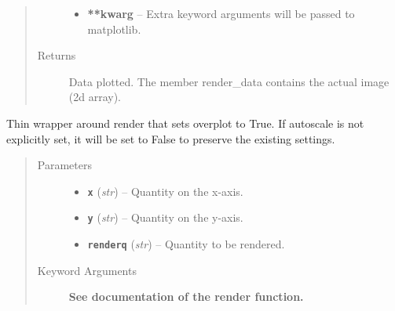 \documentclass[letterpaper,10pt,english]{sphinxmanual}
\begin{document}
\begin{fulllineitems}
\begin{quote}
\begin{description}
\begin{itemize}
\item {} 
\textbf{**kwarg} --
Extra keyword arguments will be passed to matplotlib.

\end{itemize}

\item[{Returns}] \leavevmode
Data plotted. The member render\_data contains the actual image (2d array).

\end{description}\end{quote}

\end{fulllineitems}


\begin{fulllineitems}
\label{index:facade.addrender}
Thin wrapper around render that sets overplot to True.  If autoscale is
not explicitly set, it will be set to False to preserve the existing settings.
\begin{quote}\begin{description}
\item[{Parameters}] \leavevmode\begin{itemize}
\item {} 
\textbf{\texttt{x}} (\emph{str}) -- Quantity on the x-axis.

\item {} 
\textbf{\texttt{y}} (\emph{str}) -- Quantity on the y-axis.

\item {} 
\textbf{\texttt{renderq}} (\emph{str}) -- Quantity to be rendered.

\end{itemize}

\item[{Keyword Arguments}] \leavevmode
\textbf{See documentation of the render function.}

\end{description}\end{quote}

\end{fulllineitems}

\end{document}

